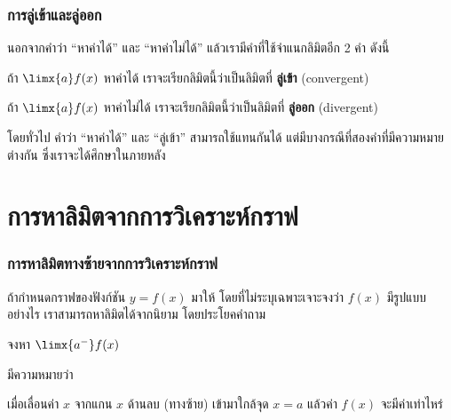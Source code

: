 \begin{frame}
\frametitle{การลู่เข้าและลู่ออก}
นอกจากคำว่า ``หาค่าได้'' และ ``หาค่าไม่ได้'' แล้วเรามีคำที่ใช้จำแนกลิมิตอีก 2 คำ ดังนี้
\begin{defn}{}{}
ถ้า $\limx{a} f(x)$ หาค่าได้ เราจะเรียกลิมิตนี้ว่าเป็นลิมิตที่ \textbf{ลู่เข้า} (convergent)

ถ้า $\limx{a} f(x)$ หาค่าไม่ได้ เราจะเรียกลิมิตนี้ว่าเป็นลิมิตที่ \textbf{ลู่ออก} (divergent)
\end{defn}
โดยทั่วไป คำว่า ``หาค่าได้'' และ ``ลู่เข้า'' สามารถใช้แทนกันได้ แต่มีบางกรณีที่สองคำที่มีความหมายต่างกัน ซึ่งเราจะได้ศึกษาในภายหลัง
\end{frame}

\section[ลิมิตจากกราฟ]{การหาลิมิตจากการวิเคราะห์กราฟ}
\frame{\sectionpage}

\begin{frame}
\frametitle{การหาลิมิตทางซ้ายจากการวิเคราะห์กราฟ}

ถ้ากำหนดกราฟของฟังก์ชัน $y = f(x)$ มาให้ โดยที่ไม่ระบุเฉพาะเจาะจงว่า $f(x)$ มีรูปแบบอย่างไร เราสามารถหาลิมิตได้จากนิยาม โดยประโยคคำถาม

\begin{remark}{}
\begin{center}
จงหา $\limx{a^{-}} f(x)$
\end{center}
\end{remark}

มีความหมายว่า

\begin{remark}{}
\begin{center}
เมื่อเลื่อนค่า $x$ จากแกน $x$ ด้านลบ (ทางซ้าย) เข้ามาใกล้จุด $x=a$ แล้วค่า $f(x)$ จะมีค่าเท่าไหร่
\end{center}
\end{remark}
\end{frame}

